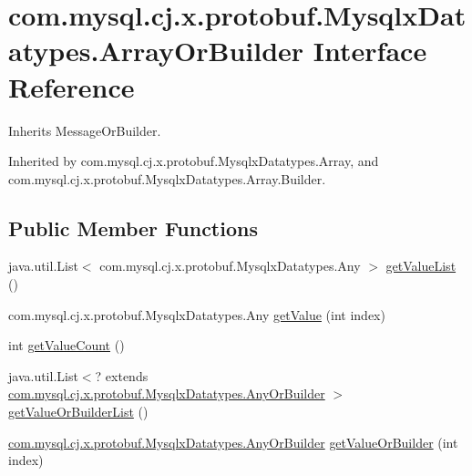 \hypertarget{interfacecom_1_1mysql_1_1cj_1_1x_1_1protobuf_1_1_mysqlx_datatypes_1_1_array_or_builder}{}\section{com.\+mysql.\+cj.\+x.\+protobuf.\+Mysqlx\+Datatypes.\+Array\+Or\+Builder Interface Reference}
\label{interfacecom_1_1mysql_1_1cj_1_1x_1_1protobuf_1_1_mysqlx_datatypes_1_1_array_or_builder}


Inherits Message\+Or\+Builder.



Inherited by com.\+mysql.\+cj.\+x.\+protobuf.\+Mysqlx\+Datatypes.\+Array, and com.\+mysql.\+cj.\+x.\+protobuf.\+Mysqlx\+Datatypes.\+Array.\+Builder.

\subsection*{Public Member Functions}
\begin{DoxyCompactItemize}
\item 
java.\+util.\+List$<$ com.\+mysql.\+cj.\+x.\+protobuf.\+Mysqlx\+Datatypes.\+Any $>$ \mbox{\hyperlink{interfacecom_1_1mysql_1_1cj_1_1x_1_1protobuf_1_1_mysqlx_datatypes_1_1_array_or_builder_a23100bb7b51ae710414aa69bdcf34002}{get\+Value\+List}} ()
\item 
com.\+mysql.\+cj.\+x.\+protobuf.\+Mysqlx\+Datatypes.\+Any \mbox{\hyperlink{interfacecom_1_1mysql_1_1cj_1_1x_1_1protobuf_1_1_mysqlx_datatypes_1_1_array_or_builder_a57d1c9b7ccf851c74928a7cdc553c198}{get\+Value}} (int index)
\item 
int \mbox{\hyperlink{interfacecom_1_1mysql_1_1cj_1_1x_1_1protobuf_1_1_mysqlx_datatypes_1_1_array_or_builder_a490ecf372fe854f6b32447f38be29e56}{get\+Value\+Count}} ()
\item 
java.\+util.\+List$<$? extends \mbox{\hyperlink{interfacecom_1_1mysql_1_1cj_1_1x_1_1protobuf_1_1_mysqlx_datatypes_1_1_any_or_builder}{com.\+mysql.\+cj.\+x.\+protobuf.\+Mysqlx\+Datatypes.\+Any\+Or\+Builder}} $>$ \mbox{\hyperlink{interfacecom_1_1mysql_1_1cj_1_1x_1_1protobuf_1_1_mysqlx_datatypes_1_1_array_or_builder_a1a2e144dc119a975787cbf8d10b5d8a2}{get\+Value\+Or\+Builder\+List}} ()
\item 
\mbox{\hyperlink{interfacecom_1_1mysql_1_1cj_1_1x_1_1protobuf_1_1_mysqlx_datatypes_1_1_any_or_builder}{com.\+mysql.\+cj.\+x.\+protobuf.\+Mysqlx\+Datatypes.\+Any\+Or\+Builder}} \mbox{\hyperlink{interfacecom_1_1mysql_1_1cj_1_1x_1_1protobuf_1_1_mysqlx_datatypes_1_1_array_or_builder_a63bdd4c9aa8e4836404a2149effdc0ef}{get\+Value\+Or\+Builder}} (int index)
\end{DoxyCompactItemize}


